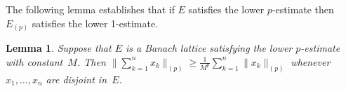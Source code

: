 \documentclass[12pt]{amsart}
\makeatletter
\theoremstyle{plain}
\newtheorem{lemma}[theorem]{Lemma}
\theoremstyle{definition}
\newcommand{\norm}[1]{\lVert#1\rVert}
\newcommand{\bignorm}[1]{\bigl\lVert#1\bigr\rVert}
\renewcommand{\ge}{\geqslant}
\def\@tvsp{\mathchoice{{}\mkern-4.5mu}{{}\mkern-4.5mu}{{}\mkern-2.5mu}{}}
\def\ltrivert{\left|\@tvsp\left|\@tvsp\left|}
\def\rtrivert{\right|\@tvsp\right|\@tvsp\right|}
\newcommand{\trinorm}[1]{\ltrivert#1\rtrivert}
\makeatother
\begin{document}


The following lemma establishes that if $E$ satisfies the lower
  $p$-estimate then $E_{(p)}$ satisfies the lower 1-estimate.

\begin{lemma}\label{p-est-norm}
  Suppose that $E$ is a Banach lattice satisfying the lower
  $p$-estimate with constant~$M$. Then
  \begin{math}
    \bignorm{\sum_{k=1}^nx_k}_{(p)}
    \ge\frac{1}{M^p}\sum_{k=1}^n\norm{x_k}_{(p)}
  \end{math}
  whenever $x_1,\dots,x_n$ are disjoint in~$E$.
\end{lemma}
\end{document}
